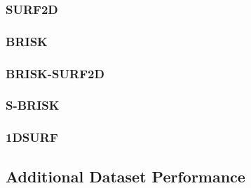\documentclass{article}
\begin{document}
\subsubsection{SURF2D}
\label{sec:2dsurfResults}


\subsubsection{BRISK}
\label{sec:briskResults}


\subsubsection{BRISK-SURF2D}
\label{sec:brisk2dsurfResults}


\subsubsection{S-BRISK}
\label{sec:sbriskResults}



\subsubsection{1DSURF}
\label{sec:1dsurfResults}





\subsection{Additional Dataset Performance}
\label{sec:additionalDataset}
\end{document}
